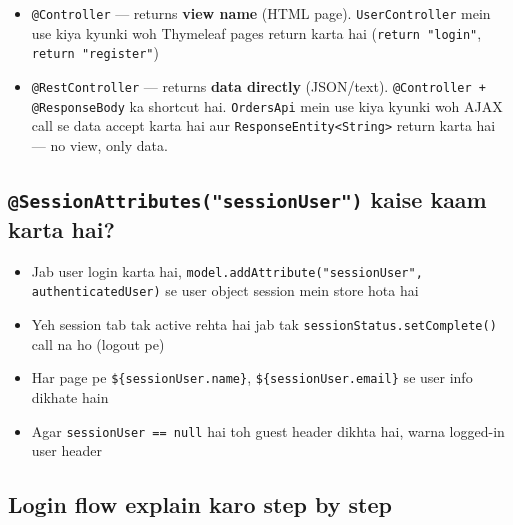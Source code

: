 \documentclass[12pt,a4paper]{article}
\begin{document}
\begin{answerbox}
\begin{itemize}
    \item \texttt{@Controller} --- returns \textbf{view name} (HTML page). \texttt{UserController} mein use kiya kyunki woh Thymeleaf pages return karta hai (\texttt{return "login"}, \texttt{return "register"})
    \item \texttt{@RestController} --- returns \textbf{data directly} (JSON/text). \texttt{@Controller + @ResponseBody} ka shortcut hai. \texttt{OrdersApi} mein use kiya kyunki woh AJAX call se data accept karta hai aur \texttt{ResponseEntity<String>} return karta hai --- no view, only data.
\end{itemize}
\end{answerbox}

\subsection{\texttt{@SessionAttributes("sessionUser")} kaise kaam karta hai?}

\begin{answerbox}
\begin{itemize}
    \item Jab user login karta hai, \texttt{model.addAttribute("sessionUser", authenticatedUser)} se user object session mein store hota hai
    \item Yeh session tab tak active rehta hai jab tak \texttt{sessionStatus.setComplete()} call na ho (logout pe)
    \item Har page pe \texttt{\$\{sessionUser.name\}}, \texttt{\$\{sessionUser.email\}} se user info dikhate hain
    \item Agar \texttt{sessionUser == null} hai toh guest header dikhta hai, warna logged-in user header
\end{itemize}
\end{answerbox}

\subsection{Login flow explain karo step by step}
\end{document}
